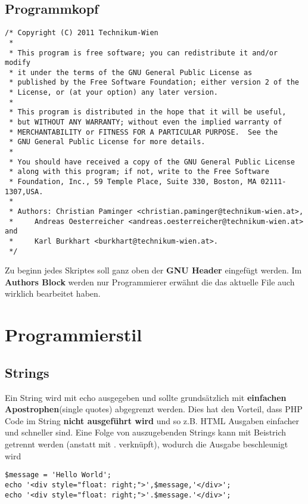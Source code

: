 \subsection{Programmkopf}

\begin{verbatim}
/* Copyright (C) 2011 Technikum-Wien
 *
 * This program is free software; you can redistribute it and/or modify
 * it under the terms of the GNU General Public License as
 * published by the Free Software Foundation; either version 2 of the
 * License, or (at your option) any later version.
 *
 * This program is distributed in the hope that it will be useful,
 * but WITHOUT ANY WARRANTY; without even the implied warranty of
 * MERCHANTABILITY or FITNESS FOR A PARTICULAR PURPOSE.  See the
 * GNU General Public License for more details.
 *
 * You should have received a copy of the GNU General Public License
 * along with this program; if not, write to the Free Software
 * Foundation, Inc., 59 Temple Place, Suite 330, Boston, MA 02111-1307,USA.
 *
 * Authors: Christian Paminger <christian.paminger@technikum-wien.at>,
 *     Andreas Oesterreicher <andreas.oesterreicher@technikum-wien.at> and
 *     Karl Burkhart <burkhart@technikum-wien.at>.
 */
\end{verbatim}
Zu beginn jedes Skriptes soll ganz oben der {\bf GNU Header} eingef\"ugt werden. \newline
Im {\bf Authors Block} werden nur Programmierer erw\"ahnt die das aktuelle File auch wirklich bearbeitet haben. 

\section{Programmierstil}
\subsection{Strings}
Ein String wird mit echo ausgegeben und sollte grunds\"atzlich mit {\bf einfachen Apostrophen}(single quotes) abgegrenzt werden. Dies hat den Vorteil, dass PHP Code im String {\bf nicht ausgef\"uhrt wird} und so z.B. HTML Ausgaben einfacher und schneller sind. Eine Folge von auszugebenden Strings kann mit Beistrich getrennt werden (anstatt mit . verkn\"upft), wodurch die Ausgabe beschleunigt wird

\begin{verbatim}
$message = 'Hello World';
echo '<div style="float: right;">',$message,'</div>';
echo '<div style="float: right;">'.$message.'</div>';
\end{verbatim}

